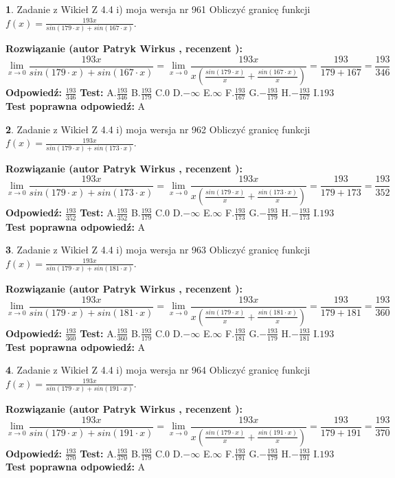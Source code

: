 \documentclass[12pt, a4paper]{article}
\theoremstyle{definition} %
\newtheorem{zad}{}
\newcommand{\zadStart}[1]{\begin{zad}#1\newline}
\newcommand{\zadStop}{\end{zad}}
\newcommand{\rozwStart}[2]{\noindent \textbf{Rozwiązanie (autor #1 , recenzent #2): }\newline}
\newcommand{\rozwStop}{\newline}
\newcommand{\odpStart}{\noindent \textbf{Odpowiedź:}\newline}
\newcommand{\odpStop}{\newline}
\newcommand{\testStart}{\noindent \textbf{Test:}\newline}
\newcommand{\testStop}{\newline}
\newcommand{\kluczStart}{\noindent \textbf{Test poprawna odpowiedź:}\newline}
\newcommand{\kluczStop}{\newline}
\begin{document}
\zadStart{Zadanie z Wikieł Z 4.4 i) moja wersja nr 961}
Obliczyć granicę funkcji $f(x)=\frac{193x}{sin(179\cdot x) +sin(167\cdot x)}$.
\zadStop
\rozwStart{Patryk Wirkus}{}
$$\lim\limits_{x\to 0}\frac{193x}{sin(179\cdot x) +sin(167\cdot x)}=\lim\limits_{x\to 0}\frac{193x}{x(\frac{sin(179\cdot x)}{x}+\frac{sin(167\cdot x)}{x})}=\frac{193}{179+167} = \frac{193}{346}$$
\rozwStop
\odpStart
$\frac{193}{346}$
\odpStop
\testStart
A.$\frac{193}{346}$
B.$\frac{193}{179}$
C.$0$
D.$-\infty$
E.$\infty$
F.$\frac{193}{167}$
G.$-\frac{193}{179}$
H.$-\frac{193}{167}$
I.$193$
\testStop
\kluczStart
A
\kluczStop



\zadStart{Zadanie z Wikieł Z 4.4 i) moja wersja nr 962}
Obliczyć granicę funkcji $f(x)=\frac{193x}{sin(179\cdot x) +sin(173\cdot x)}$.
\zadStop
\rozwStart{Patryk Wirkus}{}
$$\lim\limits_{x\to 0}\frac{193x}{sin(179\cdot x) +sin(173\cdot x)}=\lim\limits_{x\to 0}\frac{193x}{x(\frac{sin(179\cdot x)}{x}+\frac{sin(173\cdot x)}{x})}=\frac{193}{179+173} = \frac{193}{352}$$
\rozwStop
\odpStart
$\frac{193}{352}$
\odpStop
\testStart
A.$\frac{193}{352}$
B.$\frac{193}{179}$
C.$0$
D.$-\infty$
E.$\infty$
F.$\frac{193}{173}$
G.$-\frac{193}{179}$
H.$-\frac{193}{173}$
I.$193$
\testStop
\kluczStart
A
\kluczStop



\zadStart{Zadanie z Wikieł Z 4.4 i) moja wersja nr 963}
Obliczyć granicę funkcji $f(x)=\frac{193x}{sin(179\cdot x) +sin(181\cdot x)}$.
\zadStop
\rozwStart{Patryk Wirkus}{}
$$\lim\limits_{x\to 0}\frac{193x}{sin(179\cdot x) +sin(181\cdot x)}=\lim\limits_{x\to 0}\frac{193x}{x(\frac{sin(179\cdot x)}{x}+\frac{sin(181\cdot x)}{x})}=\frac{193}{179+181} = \frac{193}{360}$$
\rozwStop
\odpStart
$\frac{193}{360}$
\odpStop
\testStart
A.$\frac{193}{360}$
B.$\frac{193}{179}$
C.$0$
D.$-\infty$
E.$\infty$
F.$\frac{193}{181}$
G.$-\frac{193}{179}$
H.$-\frac{193}{181}$
I.$193$
\testStop
\kluczStart
A
\kluczStop



\zadStart{Zadanie z Wikieł Z 4.4 i) moja wersja nr 964}
Obliczyć granicę funkcji $f(x)=\frac{193x}{sin(179\cdot x) +sin(191\cdot x)}$.
\zadStop
\rozwStart{Patryk Wirkus}{}
$$\lim\limits_{x\to 0}\frac{193x}{sin(179\cdot x) +sin(191\cdot x)}=\lim\limits_{x\to 0}\frac{193x}{x(\frac{sin(179\cdot x)}{x}+\frac{sin(191\cdot x)}{x})}=\frac{193}{179+191} = \frac{193}{370}$$
\rozwStop
\odpStart
$\frac{193}{370}$
\odpStop
\testStart
A.$\frac{193}{370}$
B.$\frac{193}{179}$
C.$0$
D.$-\infty$
E.$\infty$
F.$\frac{193}{191}$
G.$-\frac{193}{179}$
H.$-\frac{193}{191}$
I.$193$
\testStop
\kluczStart
A
\kluczStop
\end{document}

